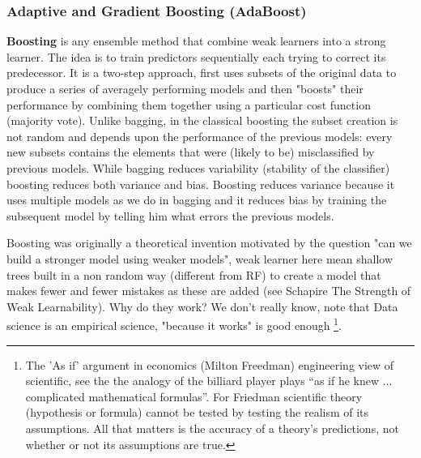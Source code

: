 \documentclass[11pt]{article}
\theoremstyle{definition}
\theoremstyle{remark}
\begin{document}


\subsubsection{Adaptive and Gradient Boosting (AdaBoost)}
\textbf{Boosting} is any ensemble method that combine weak learners into a strong learner. The idea is to train predictors sequentially each trying to correct its predecessor. It is a two-step approach, first uses subsets of the original data to produce a series of averagely performing models and then "boosts" their performance by combining them together using a particular cost function (majority vote). Unlike bagging, in the classical boosting the subset creation is not random and depends upon the performance of the previous models: every new subsets contains the elements that were (likely to be) misclassified by previous models.
While bagging reduces variability (stability of the classifier) boosting reduces both variance and bias. Boosting reduces variance because it uses multiple models as we do in bagging and it reduces bias by training the subsequent model by telling him what errors the previous models.

Boosting was originally a theoretical invention motivated by the question "can we build a stronger model using weaker models", weak learner here mean shallow trees built in a non random way (different from RF) to create a model that makes fewer and fewer mistakes as these are added (see Schapire The Strength of Weak Learnability). 
Why do they work? We don't really know, note that Data science is an empirical science, "because it works" is good enough \footnote{The 'As if' argument in economics (Milton Freedman) engineering view of scientific, see the the analogy of the billiard player plays “as if he knew ... complicated mathematical formulas”. For Friedman scientific theory (hypothesis or formula) cannot be tested by testing the realism of its assumptions.  All that matters is the accuracy of a theory’s predictions, not whether or not its assumptions are true. }. %
\end{document}
